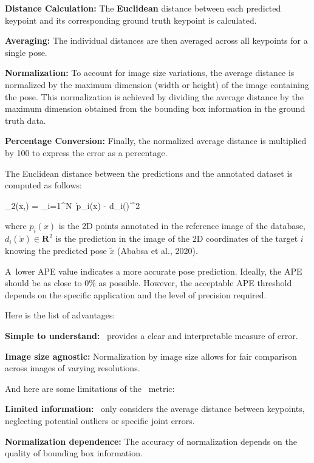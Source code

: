 \startitemize[n]
    \item {\bf Distance Calculation:} The {\bf Euclidean} distance between each predicted keypoint and its corresponding ground truth keypoint is calculated.
    \item {\bf Averaging:} The individual distances are then averaged across all keypoints for a single pose.
    \item {\bf Normalization:} To account for image size variations, the average distance is normalized by the maximum dimension (width or height) of the image containing the pose. This normalization is achieved by dividing the average distance by the maximum dimension obtained from the bounding box information in the ground truth data.
    \item {\bf Percentage Conversion:} Finally, the normalized average distance is multiplied by 100 to express the error as a percentage.
\stopitemize

The Euclidean distance between the predictions and the annotated dataset is computed as follows:

\startplaceformula[reference=euclidean-distance]
    _2(x,) =  \sum_{i=1}^{N} \|\,p_i(x) - d_i()\,\|^{2}
    \stopformula
\stopplaceformula

where $ p_i (x) $ is the 2D points annotated in the reference image of the database, $ d_i (\tilde{x}) \in  \mathbf R^2 $ is the prediction in the image of the 2D coordinates of the target $ i $ knowing the predicted pose $ \tilde{x} $ (Ababsa et al., 2020).

A~lower APE value indicates a more accurate pose prediction. Ideally, the APE should be as close to 0\% as possible. However, the acceptable APE threshold depends on the specific application and the level of precision required.

Here is the list of advantages:
\startitemize[1]
    \item {\bf Simple to understand:} \APE\ provides a clear and interpretable measure of error.
    \item {\bf Image size agnostic:} Normalization by image size allows for fair comparison across images of varying resolutions.
\stopitemize

And here are some limitations of the \APE\ metric:
\startitemize[1]
    \item {\bf Limited information:} \APE\ only considers the average distance between keypoints, neglecting potential outliers or specific joint errors.
    \item {\bf Normalization dependence:} The accuracy of normalization depends on the quality of bounding box information.
\stopitemize

